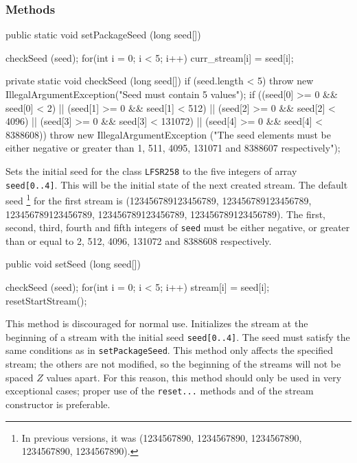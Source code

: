 \subsubsection* {Methods}
\begin{code}
    public static void setPackageSeed (long seed[]) \begin{hide} {
       checkSeed (seed);
       for(int i = 0; i < 5; i++)
          curr_stream[i] = seed[i];
    }

   private static void checkSeed (long seed[]) {
      if (seed.length < 5)
         throw new IllegalArgumentException("Seed must contain 5 values");
      if ((seed[0] >= 0 && seed[0] < 2)  ||
          (seed[1] >= 0 && seed[1] < 512)  ||
          (seed[2] >= 0 && seed[2] < 4096) ||
          (seed[3] >= 0 && seed[3] < 131072) ||
          (seed[4] >= 0 && seed[4] < 8388608))
         throw new IllegalArgumentException
         ("The seed elements must be either negative or greater than 1, 511, 4095, 131071 and 8388607 respectively");
   }\end{hide}
\end{code}
\begin{tabb} Sets the initial seed for the class \texttt{LFSR258} to the five
  integers of array \texttt{seed[0..4]}.
  This will be the initial state of the next created stream.
  The default seed \footnote{In previous versions, it was
  (1234567890, 1234567890, 1234567890, 1234567890, 1234567890).}
  for the first stream is (123456789123456789, 123456789123456789, 123456789123456789,
 123456789123456789, 123456789123456789).
  The first, second, third, fourth and fifth integers of \texttt{seed}
  must be either negative,
  or greater than or equal to 2, 512, 4096, 131072 and 8388608 respectively.
\end{tabb}
\begin{htmlonly}
\end{htmlonly}
\begin{code}

    public void setSeed (long seed[]) \begin{hide} {
       checkSeed (seed);
       for(int i = 0; i < 5; i++)
           stream[i] = seed[i];
       resetStartStream();
    }\end{hide}
\end{code}
\begin{tabb} This method is discouraged for normal use.
  Initializes the stream at the beginning of a stream with the initial
  seed \texttt{seed[0..4]}. The seed must satisfy the same conditions
  as in \texttt{setPackageSeed}.
  This method only affects the specified stream; the others are not
  modified, so the beginning of the streams will not be
  spaced $Z$ values apart.
  For this reason, this method should only be used in very
  exceptional cases; proper use of the \texttt{reset...} methods
  and of the stream constructor is preferable.
\end{tabb}
